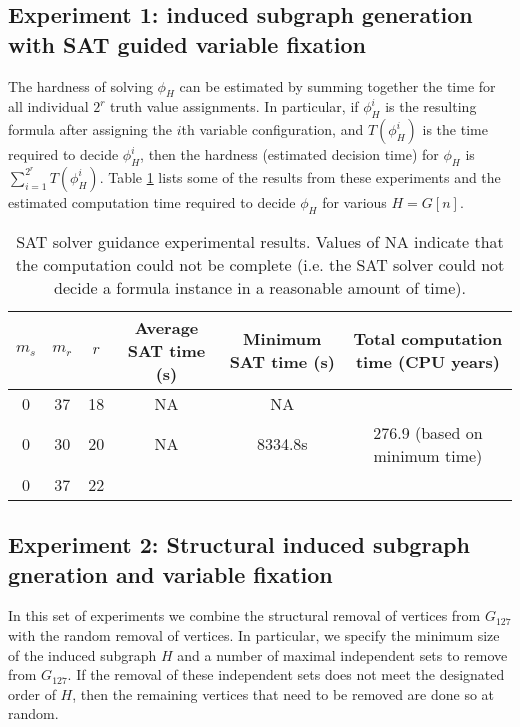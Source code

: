 \documentclass[paper=a4, fontsize=11pt]{scrartcl} %
\begin{document}
\subsection{Experiment 1: induced subgraph generation with SAT guided variable fixation}
The hardness of solving $\phi_H$ can be estimated by summing together the time for
all individual $2^r$ truth value assignments. In particular, if $\phi_H^i$ is the
resulting formula after assigning the $i$th variable configuration, and $T(\phi_H^i)$ 
is the time required to decide $\phi_H^i$, then the hardness (estimated decision time)
for $\phi_H$ is $\sum_{i = 1}^{2^r} T(\phi_H^i)$. Table \ref{tab:guidanceExperiment}
lists some of the results from these experiments and the estimated computation time
required to decide $\phi_H$ for various $H = G[n]$.

\begin{table}
	\caption{SAT solver guidance experimental results. Values of NA indicate that the computation
	could not be complete (i.e. the SAT solver could not decide a formula instance in a reasonable
	amount of time).}
	\begin{tabular}{c | c | c | c | c | c}
		\hline
		$m_s$ & $m_r$ & $r$ & Average SAT time (s) & Minimum SAT time (s) & Total computation time (CPU years)\\ \hline
		0 & 37 & 18 & NA & NA \\ \hline
		0 & 30 & 20 & NA & 8334.8s & 276.9 (based on minimum time) \\ \hline
		0 & 37 & 22 & ~ & ~ & ~ \\
		\hline
	\end{tabular}
	\label{tab:guidanceExperiment}
\end{table}


\subsection{Experiment 2: Structural induced subgraph gneration and variable fixation}
In this set of experiments we combine the structural removal of vertices from $G_{127}$
with the random removal of vertices. In particular, we specify the minimum size of 
the induced subgraph $H$ and a number of maximal independent sets to remove from $G_{127}$.
If the removal of these independent sets does not meet the designated order of $H$,
then the remaining vertices that need to be removed are done so at random. 
\end{document}
